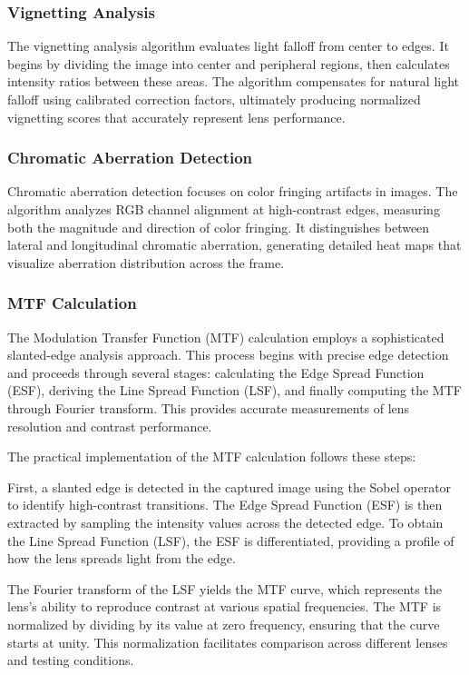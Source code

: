 \subsubsection{Vignetting Analysis}
The vignetting analysis algorithm evaluates light falloff from center to edges. It begins by dividing the image into center and peripheral regions, then calculates intensity ratios between these areas. The algorithm compensates for natural light falloff using calibrated correction factors, ultimately producing normalized vignetting scores that accurately represent lens performance.

\subsubsection{Chromatic Aberration Detection}
Chromatic aberration detection focuses on color fringing artifacts in images. The algorithm analyzes RGB channel alignment at high-contrast edges, measuring both the magnitude and direction of color fringing. It distinguishes between lateral and longitudinal chromatic aberration, generating detailed heat maps that visualize aberration distribution across the frame.

\subsubsection{MTF Calculation}
The Modulation Transfer Function (MTF) calculation employs a sophisticated slanted-edge analysis approach. This process begins with precise edge detection and proceeds through several stages: calculating the Edge Spread Function (ESF), deriving the Line Spread Function (LSF), and finally computing the MTF through Fourier transform. This provides accurate measurements of lens resolution and contrast performance.

The practical implementation of the MTF calculation follows these steps:

First, a slanted edge is detected in the captured image using the Sobel operator to identify high-contrast transitions. The Edge Spread Function (ESF) is then extracted by sampling the intensity values across the detected edge. To obtain the Line Spread Function (LSF), the ESF is differentiated, providing a profile of how the lens spreads light from the edge.

The Fourier transform of the LSF yields the MTF curve, which represents the lens's ability to reproduce contrast at various spatial frequencies. The MTF is normalized by dividing by its value at zero frequency, ensuring that the curve starts at unity. This normalization facilitates comparison across different lenses and testing conditions.

